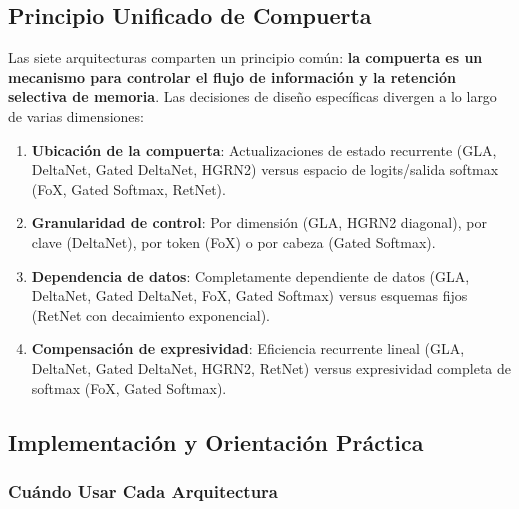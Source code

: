\documentclass[11pt,a4paper]{article}
\begin{document}
\subsection{Principio Unificado de Compuerta}

Las siete arquitecturas comparten un principio común: \textbf{la compuerta es un mecanismo para controlar el flujo de información y la retención selectiva de memoria}. Las decisiones de diseño específicas divergen a lo largo de varias dimensiones:

\begin{enumerate}[leftmargin=*]
    \item \textbf{Ubicación de la compuerta}: Actualizaciones de estado recurrente (GLA, DeltaNet, Gated DeltaNet, HGRN2) versus espacio de logits/salida softmax (FoX, Gated Softmax, RetNet).
    \item \textbf{Granularidad de control}: Por dimensión (GLA, HGRN2 diagonal), por clave (DeltaNet), por token (FoX) o por cabeza (Gated Softmax).
    \item \textbf{Dependencia de datos}: Completamente dependiente de datos (GLA, DeltaNet, Gated DeltaNet, FoX, Gated Softmax) versus esquemas fijos (RetNet con decaimiento exponencial).
    \item \textbf{Compensación de expresividad}: Eficiencia recurrente lineal (GLA, DeltaNet, Gated DeltaNet, HGRN2, RetNet) versus expresividad completa de softmax (FoX, Gated Softmax).
\end{enumerate}

\subsection{Implementación y Orientación Práctica}

\subsubsection{Cuándo Usar Cada Arquitectura}
\end{document}
